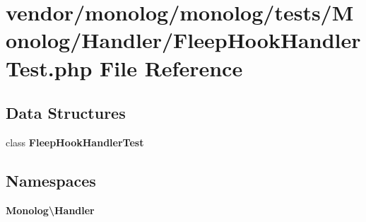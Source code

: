 \section{vendor/monolog/monolog/tests/\+Monolog/\+Handler/\+Fleep\+Hook\+Handler\+Test.php File Reference}
\label{_fleep_hook_handler_test_8php}
\subsection*{Data Structures}
\begin{DoxyCompactItemize}
\item 
class {\bf Fleep\+Hook\+Handler\+Test}
\end{DoxyCompactItemize}
\subsection*{Namespaces}
\begin{DoxyCompactItemize}
\item 
 {\bf Monolog\textbackslash{}\+Handler}
\end{DoxyCompactItemize}
